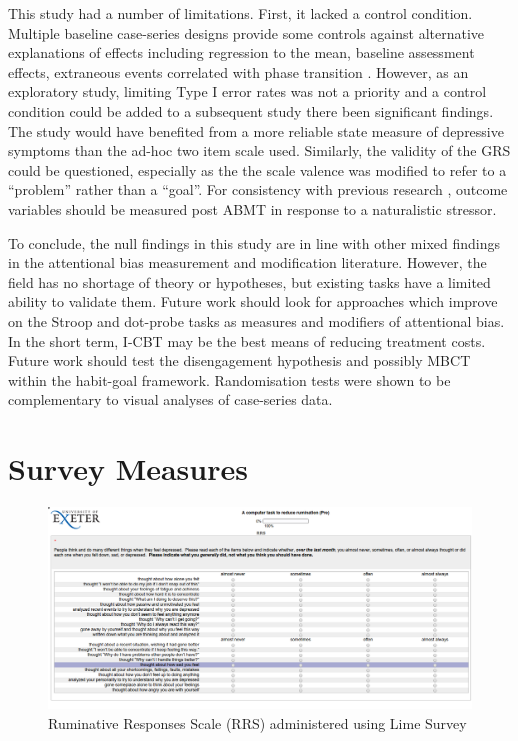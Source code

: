\documentclass[man,floatsintext,a4paper,biblatex]{apa6}\usepackage[]{graphicx}\usepackage[]{color}
\begin{document}
This study had a number of limitations. First, it lacked
a control condition. Multiple baseline case-series designs
provide some controls against alternative explanations of
effects including regression to the mean, baseline assessment
effects, extraneous events correlated with phase transition
\parencite{watson_nonconcurrent_1981,watkins_ruminationfocused_2007}.
However, as an exploratory study, limiting Type I error rates was not
a priority and a control condition could be added to a subsequent study
there been significant findings. The study would have benefited from a
more reliable state measure of depressive symptoms than the ad-hoc two
item scale used. Similarly, the validity of the GRS could be questioned,
especially as the the scale valence was modified to refer to a ``problem''
rather than a ``goal''. For consistency with previous research
\parencite{see_reduction_2009}, outcome variables should be measured
post ABMT in response to a naturalistic stressor.

To conclude, the null findings in this study are in line with other
mixed findings in the attentional bias measurement and modification
literature. However, the field has no shortage of theory or hypotheses,
but existing tasks have a limited ability to validate them. Future work
should look for approaches which improve on the Stroop and dot-probe
tasks as measures and modifiers of attentional bias. In the short term,
I-CBT may be the best means of reducing treatment costs. Future work
should test the disengagement hypothesis and possibly MBCT within the
habit-goal framework. Randomisation tests were shown to be complementary
to visual analyses of case-series data.

\printbibliography

\newpage
\appendix
\appendixpage

\setcounter{tocdepth}{1}
\startcontents[sections]

\section{Survey Measures}
\label{app:surveys}

\begin{figure}
\includegraphics[width=270mm]{figure/rrs.png}
\caption{Ruminative Responses Scale (RRS) administered using Lime Survey}
\end{figure}
\end{document}
